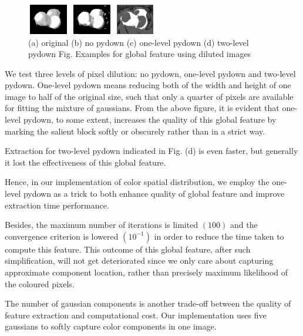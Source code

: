 \documentclass[10pt,twocolumn,letterpaper]{article}
\begin{document}
\begin{figure}
\begin{center}
    \includegraphics[width=0.72in,height=0.52in]{./Figures/pydownCompare/3NOPYDOWN.jpg}
    \includegraphics[width=0.72in,height=0.52in]{./Figures/pydownCompare/3PYDOWN.jpg} 
    \includegraphics[width=0.72in,height=0.52in]{./Figures/pydownCompare/3DOUBLEPYDOWN.jpg} \\
    \footnotesize (a) original (b) no pydown (c) one-level pydown (d) two-level pydown
    Fig. Examples for global feature using diluted images \\
    \end{center}
\end{figure}

We test three levels of pixel dilution: no pydown, one-level pydown and two-level pydown. One-level pydown means reducing both of the width and height of one image to half of the original size,  such that only a quarter of pixels are available for fitting the mixture of gaussians. From the above figure, it is evident that one-level pydown, to some extent, increases the quality of  this global feature by marking the salient block softly or obscurely rather than in a strict way. 

Extraction for two-level pydown indicated in Fig. (d) is even faster, but generally it lost the effectiveness of this global feature.

Hence, in our implementation of color spatial distribution, we employ the one-level pydown as a trick to both enhance quality of global feature and improve extraction time performance.

Besides, the maximum number of iterations is limited $(100)$ and the convergence criterion is lowered $(10^{-1})$ in order to reduce the time taken to compute this feature.  This outcome of this global feature, after such simplification, will not get deteriorated since we only care about capturing  approximate component location, rather than precisely maximum likelihood of the coloured pixels.

The number of gaussian components is another trade-off between the quality of feature extraction and computational cost. Our implementation uses five gaussians to softly capture color components in one image. 
\end{document}
